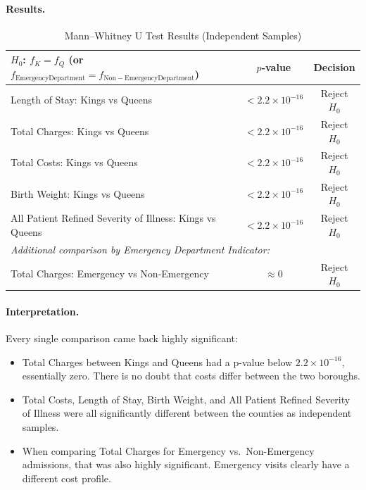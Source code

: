\documentclass[12pt]{article}
\begin{document}
\paragraph{Results.}

\begin{table}[H]
\centering
\caption{Mann--Whitney U Test Results (Independent Samples)}
\label{tab:mannwhitney}
\begin{tabular}{lcc}
\toprule
\textbf{$H_0$: $f_K = f_Q$ (or $f_\mathrm{Emergency Department} = f_\mathrm{Non-Emergency Department}$)} & \textbf{$p$-value} & \textbf{Decision} \\
\midrule
Length of Stay: Kings vs Queens           & $< 2.2 \times 10^{-16}$ & Reject $H_0$ \\
Total Charges: Kings vs Queens            & $< 2.2 \times 10^{-16}$ & Reject $H_0$ \\
Total Costs: Kings vs Queens              & $< 2.2 \times 10^{-16}$ & Reject $H_0$ \\
Birth Weight: Kings vs Queens             & $< 2.2 \times 10^{-16}$ & Reject $H_0$ \\
All Patient Refined Severity of Illness: Kings vs Queens  & $< 2.2 \times 10^{-16}$ & Reject $H_0$ \\
\midrule
\multicolumn{3}{l}{\textit{Additional comparison by Emergency Department Indicator:}} \\
Total Charges: Emergency vs Non-Emergency & $\approx 0$ & Reject $H_0$ \\
\bottomrule
\end{tabular}
\end{table}

\paragraph{Interpretation.}
Every single comparison came back highly significant:
\begin{itemize}[nosep]
    \item Total Charges between Kings and Queens had a p-value below $2.2 \times 10^{-16}$, essentially zero. There is no doubt that costs differ between the two boroughs.
    \item Total Costs, Length of Stay, Birth Weight, and All Patient Refined Severity of Illness were all significantly different between the counties as independent samples.
    \item When comparing Total Charges for Emergency vs.\ Non-Emergency admissions, that was also highly significant. Emergency visits clearly have a different cost profile.
\end{itemize}
\end{document}
